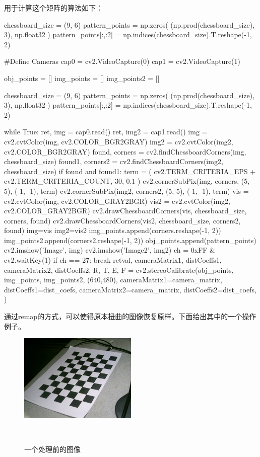 用于计算这个矩阵的算法如下：
\begin{python}
chessboard_size = (9, 6)
pattern_points = np.zeros( (np.prod(chessboard_size), 3), np.float32 )
pattern_points[:,:2] = np.indices(chessboard_size).T.reshape(-1, 2)

#Define Cameras
cap0 = cv2.VideoCapture(0)
cap1 = cv2.VideoCapture(1)

obj_points = []
img_points = []
img_points2 = []

chessboard_size = (9, 6)
pattern_points = np.zeros( (np.prod(chessboard_size), 3), np.float32 )
pattern_points[:,:2] = np.indices(chessboard_size).T.reshape(-1, 2)

while True:
	ret, img = cap0.read()
	ret, img2 = cap1.read()
	img = cv2.cvtColor(img, cv2.COLOR_BGR2GRAY)
	img2 = cv2.cvtColor(img2, cv2.COLOR_BGR2GRAY)
	found, corners = cv2.findChessboardCorners(img, chessboard_size)
	found1, corners2 = cv2.findChessboardCorners(img2, chessboard_size)
	if found and found1:
		term = ( cv2.TERM_CRITERIA_EPS + cv2.TERM_CRITERIA_COUNT, 30, 0.1 )
		cv2.cornerSubPix(img, corners, (5, 5), (-1, -1), term)
		cv2.cornerSubPix(img2, corners2, (5, 5), (-1, -1), term)
		vis = cv2.cvtColor(img, cv2.COLOR_GRAY2BGR)
		vis2 = cv2.cvtColor(img2, cv2.COLOR_GRAY2BGR)
		cv2.drawChessboardCorners(vis, chessboard_size, corners, found)
		cv2.drawChessboardCorners(vis2, chessboard_size, corners2, found)
		img=vis
		img2=vis2
		img_points.append(corners.reshape(-1, 2))
		img_points2.append(corners2.reshape(-1, 2))
		obj_points.append(pattern_points)
	cv2.imshow('Image', img)
	cv2.imshow('Image2', img2)
	ch = 0xFF & cv2.waitKey(1)
	if ch == 27:
		break	
retval, cameraMatrix1, distCoeffs1, cameraMatrix2, distCoeffs2, R, T, E, F = cv2.stereoCalibrate(obj_points,
																							img_points,
																							img_points2,
																							(640,480),
																							cameraMatrix1=camera_matrix,
																							distCoeffs1=dist_coefs,
																							cameraMatrix2=camera_matrix,
																							distCoeffs2=dist_coefs,
																							)
\end{python}
通过remap的方式，可以使得原本扭曲的图像恢复原样。下面给出其中的一个操作例子。
\begin{figure}[h!]

  \centering
    \includegraphics[width=0.5\textwidth]{../src/2014-02-24-225333.jpg}
    \caption{一个处理前的图像}\\
\end{figure}
